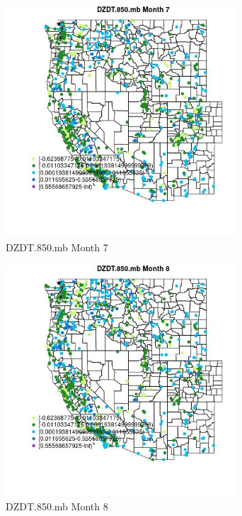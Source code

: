 \begin{figure} 
\centering  
\includegraphics[width=0.77\textwidth]{Code_Outputs/Report_ML_input_PM25_Step4_part_e_de_duplicated_aves_compiled_2019-05-21wNAs_MapObsMo7DZDT850mb.jpg} 
\caption{\label{fig:Report_ML_input_PM25_Step4_part_e_de_duplicated_aves_compiled_2019-05-21wNAsMapObsMo7DZDT850mb}DZDT.850.mb Month 7} 
\end{figure} 
 

\begin{figure} 
\centering  
\includegraphics[width=0.77\textwidth]{Code_Outputs/Report_ML_input_PM25_Step4_part_e_de_duplicated_aves_compiled_2019-05-21wNAs_MapObsMo8DZDT850mb.jpg} 
\caption{\label{fig:Report_ML_input_PM25_Step4_part_e_de_duplicated_aves_compiled_2019-05-21wNAsMapObsMo8DZDT850mb}DZDT.850.mb Month 8} 
\end{figure} 
 

